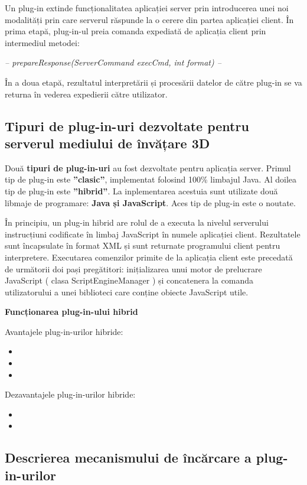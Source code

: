 Un plug-in extinde funcționalitatea aplicației server prin introducerea unei noi modalități prin care serverul răspunde la o cerere din partea aplicației client. În prima etapă, plug-in-ul preia comanda expediată de aplicația client prin intermediul metodei: \begin{center} \textit{-- prepareResponse(ServerCommand execCmd, int format) --}
\end{center} În a doua etapă, rezultatul interpretării și procesării datelor de către plug-in se va returna în vederea expedierii către utilizator.

\subsection{Tipuri de plug-in-uri dezvoltate pentru serverul mediului de învățare 3D}
\par Două \textbf{tipuri de plug-in-uri} au fost dezvoltate pentru aplicația server. Primul tip de plug-in este \textbf{”clasic”}, implementat folosind 100\% limbajul Java. Al doilea tip de plug-in este \textbf{”hibrid”}. La inplementarea acestuia sunt utilizate două libmaje de programare: \textbf{Java și JavaScript}. Aces tip de plug-in este o noutate.

\par În principiu, un plug-in hibrid are rolul de a executa la nivelul serverului instrucțiuni codificate în limbaj JavaScript în numele aplicației client. Rezultatele sunt încapsulate în format XML și sunt returnate programului client pentru interpretere. Executarea comenzilor primite de la aplicația client este precedată de următorii doi pași pregătitori: inițializarea unui motor de prelucrare JavaScript ( clasa ScriptEngineManager ) și concatenera la comanda utilizatorului a unei biblioteci care conține obiecte JavaScript utile.

\par \textbf{Funcționarea plug-in-ului hibrid }


\par Avantajele plug-in-urilor hibride:
\begin{itemize}
\item 
\item
\item
\end{itemize}

\par Dezavantajele plug-in-urilor hibride:
\begin{itemize}
\item 
\item
\end{itemize}


\subsection{Descrierea mecanismului de încărcare a plug-in-urilor}
